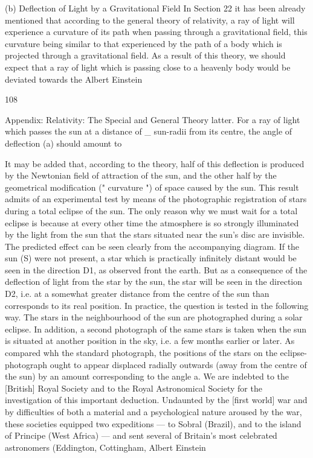 \documentclass{article}
\begin{document}
(b) Deflection of Light by a Gravitational Field
In Section 22 it has been already mentioned that according to the general theory of
relativity, a ray of light will experience a curvature of its path when passing through a
gravitational field, this curvature being similar to that experienced by the path of a body
which is projected through a gravitational field. As a result of this theory, we should expect
that a ray of light which is passing close to a heavenly body would be deviated towards the
Albert Einstein

108

Appendix: Relativity: The Special and General Theory
latter. For a ray of light which passes the sun at a distance of \_ sun-radii from its centre, the
angle of deflection (a) should amount to

It may be added that, according to the theory, half of this deflection is produced by the
Newtonian field of attraction of the sun, and the other half by the
geometrical modification (" curvature ") of space caused by the sun.
This result admits of an experimental test by means of the
photographic registration of stars during a total eclipse of the sun.
The only reason why we must wait for a total eclipse is because at
every other time the atmosphere is so strongly illuminated by the
light from the sun that the stars situated near the sun's disc are
invisible. The predicted effect can be seen clearly from the
accompanying diagram. If the sun (S) were not present, a star which
is practically infinitely distant would be seen in the direction D1, as observed front the earth.
But as a consequence of the deflection of light from the star by the sun, the star will be seen
in the direction D2, i.e. at a somewhat greater distance from the centre of the sun than
corresponds to its real position.
In practice, the question is tested in the following way. The stars in the neighbourhood of
the sun are photographed during a solar eclipse. In addition, a second photograph of the
same stars is taken when the sun is situated at another position in the sky, i.e. a few months
earlier or later. As compared whh the standard photograph, the positions of the stars on the
eclipse-photograph ought to appear displaced radially outwards (away from the centre of
the sun) by an amount corresponding to the angle a.
We are indebted to the [British] Royal Society and to the Royal Astronomical Society for
the investigation of this important deduction. Undaunted by the [first world] war and by
difficulties of both a material and a psychological nature aroused by the war, these societies
equipped two expeditions — to Sobral (Brazil), and to the island of Principe (West Africa)
— and sent several of Britain's most celebrated astronomers (Eddington, Cottingham,
Albert Einstein
\end{document}
